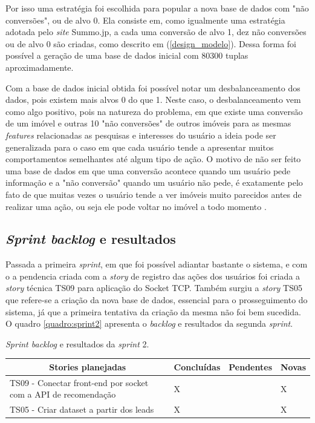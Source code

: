 Por isso uma estratégia foi escolhida para popular a nova base de dados com "não conversões", ou de alvo 0. Ela consiste em, como igualmente uma estratégia adotada pelo \textit{site} Summo.jp, a cada uma conversão de alvo 1, dez não conversões ou de alvo 0 são criadas, como descrito em (\ref{design_modelo}). Dessa forma foi possível a geração de uma base de dados inicial com 80300 tuplas aproximadamente.

Com a base de dados inicial obtida foi possível notar um desbalanceamento dos dados, pois existem mais alvos 0 do que 1. Neste caso, o desbalanceamento vem como algo positivo, pois na natureza do problema, em que existe uma conversão de um imóvel e outras 10 "não conversões" de outros imóveis para as mesmas \textit{features} relacionadas as pesquisas e interesses do usuário a ideia pode ser generalizada para o caso em que cada usuário tende a apresentar muitos comportamentos semelhantes até algum tipo de ação. O motivo de não ser feito uma base de dados em que uma conversão acontece quando um usuário pede informação e a "não conversão" quando um usuário não pede, é exatamente pelo fato de que muitas vezes o usuário tende a ver imóveis muito parecidos antes de realizar uma ação, ou seja ele pode voltar no imóvel a todo momento \cite{Summo:2017}.

\subsection{\textit{Sprint backlog} e resultados}

Passada a primeira \textit{sprint}, em que foi possível adiantar bastante o sistema, e com o a pendencia criada com a \textit{story} de registro das ações dos usuários foi criada a \textit{story} técnica TS09 para aplicação do Socket TCP. Também surgiu a \textit{story} TS05 que refere-se a criação da nova base de dados, essencial para o prosseguimento do sistema, já que a primeira tentativa da criação da mesma não foi bem sucedida. O quadro \ref{quadro:sprint2} apresenta o \textit{backlog} e resultados da segunda  \textit{sprint}.

\begin{quadro}[H]
\centering
\caption[\textit{Sprint backlog} e resultados da \textit{sprint} 2]{\textit{Sprint backlog} e resultados da \textit{sprint} 2.}
\label{quadro:sprint2}
\begin{tabular}{|p{6cm}|p{2cm}|p{2cm}|p{1cm}|}
\hline
\multicolumn{1}{|c|}{\textbf{Stories planejadas}} & \multicolumn{1}{c|}{\textbf{Concluídas}} & \multicolumn{1}{c|}{\textbf{Pendentes}} & \multicolumn{1}{c|}{\textbf{Novas}} \\ \hline
TS09 - Conectar front-end por socket com a API de recomendação & X &  & X \\ \hline
TS05 - Criar dataset a partir dos leads & X &  & X \\ \hline
\end{tabular}
\end{quadro}


